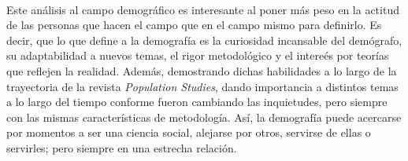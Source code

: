 \documentclass[11pt,spanish,letterpaper]{article}
\theoremstyle{plain}
\begin{document}
\\
Este an\'alisis al campo demogr\'afico es interesante al poner m\'as peso en la actitud de las personas que hacen el campo que en el campo mismo para definirlo. Es decir, que lo que define a la demograf\'ia es la curiosidad incansable del dem\'ografo, su adaptabilidad a nuevos temas, el rigor metodol\'ogico y el intere\'es por teor\'ias que reflejen la realidad. Adem\'as, demostrando dichas habilidades a lo largo de la trayectoria de la revista \textit{Population Studies}, dando importancia a distintos temas a lo largo del tiempo conforme fueron cambiando las inquietudes, pero siempre con las mismas caracter\'isticas de metodolog\'ia. As\'i, la demograf\'ia puede acercarse por momentos a ser una ciencia social, alejarse por otros, servirse de ellas o servirles; pero siempre en una estrecha relaci\'on. 


\end{document}
